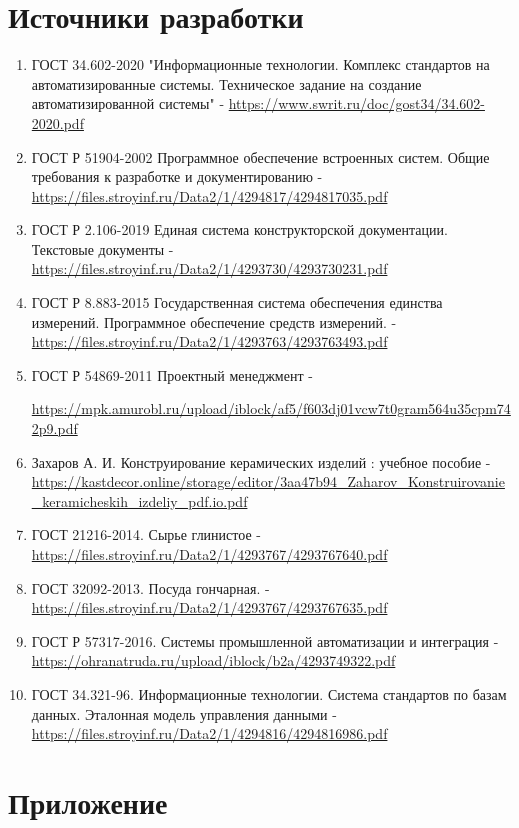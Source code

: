 \documentclass[16pt,a4paper]{article}
\begin{document}
\section{Источники разработки}
\begin{enumerate}
    \item ГОСТ 34.602-2020  "Информационные технологии. Комплекс стандартов на автоматизированные системы. Техническое задание на создание автоматизированной системы" - \url{https://www.swrit.ru/doc/gost34/34.602-2020.pdf}
    \item  ГОСТ Р 51904-2002 Программное обеспечение встроенных систем. Общие требования к разработке и документированию - \url{https://files.stroyinf.ru/Data2/1/4294817/4294817035.pdf}
    \item ГОСТ Р 2.106-2019 Единая система конструкторской документации. Текстовые документы - \url{https://files.stroyinf.ru/Data2/1/4293730/4293730231.pdf}
    \item ГОСТ Р 8.883-2015 Государственная система обеспечения единства измерений. Программное обеспечение средств измерений. - \url{https://files.stroyinf.ru/Data2/1/4293763/4293763493.pdf}
    \item ГОСТ Р 54869-2011 Проектный менеджмент - 
    
    \url{https://mpk.amurobl.ru/upload/iblock/af5/f603dj01vcw7t0gram564u35cpm742p9.pdf}
    \item Захаров А. И. Конструирование керамических изделий : учебное пособие - \url{https://kastdecor.online/storage/editor/3aa47b94_Zaharov_Konstruirovanie_keramicheskih_izdeliy_pdf.io.pdf}
    \item ГОСТ 21216-2014. Сырье глинистое - \url{https://files.stroyinf.ru/Data2/1/4293767/4293767640.pdf}
    \item ГОСТ 32092-2013. Посуда гончарная. - \url{https://files.stroyinf.ru/Data2/1/4293767/4293767635.pdf}
    \item ГОСТ Р 57317-2016. Системы промышленной автоматизации и интеграция - \url{https://ohranatruda.ru/upload/iblock/b2a/4293749322.pdf}
    \item ГОСТ 34.321-96. Информационные технологии. Система стандартов по базам данных. Эталонная модель управления данными - \url{https://files.stroyinf.ru/Data2/1/4294816/4294816986.pdf}
\end{enumerate}
\newpage
\section{Приложение}
\end{document}
